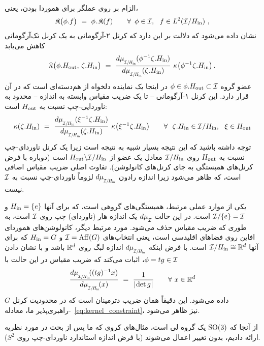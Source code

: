الزام بر روی عملگر برای هموردا بودن، یعنی،
\begin{align}
	\mathfrak{K}\big( \phi.f \big)\ =\ \phi \mkern1mu.\mkern1.5mu \mathfrak{K}(f)
	\qquad \forall\,\ \phi\in\mathcal{I},\ \ f\in L^2(\mathcal{I}/H_{\textup{in}}) \ ,
\end{align}
نشان داده می‌شود که دلالت بر این دارد که کرنل ۲-آرگومانی به یک کرنل تک‌آرگومانی کاهش می‌یابد
\begin{align}
	\widehat{\kappa} \big(\phi.\Hout,\, \zeta.\Hin \big)
	\ =\ \frac{\dmuIHin(\phi^{-1} \zeta.\Hin)}{\dmuIHin(\zeta.\Hin)}\ \kappa\big(\phi^{-1} \zeta.\Hin \big) \,.
\end{align}
عضو گروه $\phi\in \phi.H_{\textup{out}} \subset \mathcal{I}$ در اینجا یک نماینده دلخواه از هم‌دسته‌ای است که در آن قرار دارد.
این کرنل ۱-آرگومانی -- تا یک ضریب مقیاس وابسته به اندازه -- محدود به ناوردایی-چپ نسبت به $H_{\textup{out}}$ است:
\begin{align}
	\kappa(\zeta.\Hin)\ =\ \frac{\dmuIHin(\xi^{-1} \zeta.\Hin)}{\dmuIHin(\zeta.\Hin)}\ \kappa\big(\xi^{-1} \zeta.\Hin \big)
	\qquad \forall\ \ \zeta.\Hin \in \I/\Hin,\ \ \xi\in\Hout
\end{align}
توجه داشته باشید که این نتیجه بسیار شبیه به نتیجه \citet{Kondor2018-GENERAL} است زیرا یک کرنل ناوردای-چپ نسبت به $H_{\textup{out}}$ روی $\mathcal{I}/H_{\textup{in}}$ معادل یک عضو از $H_{\textup{out}}\backslash \mathcal{I}/H_{\textup{in}}$ است (دوباره با فرض کرنل‌های همبستگی به جای کرنل‌های کانولوشن).
تفاوت اصلی ضریب مقیاس اضافی است، که ظاهر می‌شود زیرا اندازه رادون $\dmuIHin$ لزوماً ناوردای-چپ نسبت به $\mathcal{I}$ نیست.


یکی از موارد عملی مرتبط، همبستگی‌های گروهی است، که برای آنها $H_{\textup{in}} = \{e\}$ و $\mathcal{I}/\{e\} = \mathcal{I}$ است.
در این حالت $d\mu_{\overset{}{\mathcal{I}}}$ یک اندازه هار (ناوردای) چپ روی $\mathcal{I}$ است، به طوری که ضریب مقیاس حذف می‌شود.
مورد مرتبط دیگر، کانولوشن‌های هموردای افاین روی فضاهای اقلیدسی است، یعنی انتخاب‌های $\mathcal{I} = \operatorname{Aff}(G)$ و $H_{\textup{in}}=G$ که برای آنها $\mathcal{I}/H_{\textup{in}} \cong \mathbb{R}^d$ است.
با فرض اینکه $\dmuIHin$ اندازه لبگ روی $\mathbb{R}^d$ باشد و با نشان دادن $\phi=tg \in \mathcal{I}$، \citet{bekkers2020bspline} اثبات می‌کند که ضریب مقیاس در این حالت با
\begin{align}
	\frac{\dmuIHin\!( (tg)^{-1}x )}{\dmuIHin\!(x)}\ =\ \frac{1}{\detg} \qquad \forall\ x\in\R^d
\end{align}
داده می‌شود. این دقیقاً همان ضریب دترمینان است که در محدودیت کرنل $G$-راهبری‌پذیر ما، معادله~\eqref{eq:kernel_constraint}، نیز ظاهر می‌شود.


از آنجا که $\operatorname{SO}(3)$ یک گروه لی است، مثال‌های  کروی که ما پس از بحث در مورد نظریه \citet{Kondor2018-GENERAL} ارائه دادیم، بدون تغییر اعمال می‌شوند (با فرض اندازه استاندارد ناوردای-چپ روی $S^2$).


